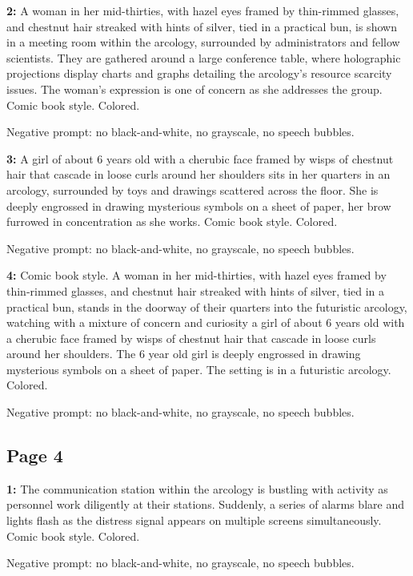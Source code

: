 \begin{iquote}
    \textbf{2:} A woman in her mid-thirties, with hazel eyes framed by thin-rimmed glasses, and chestnut hair streaked with hints of silver, tied in a practical bun, is shown in a meeting room within the arcology, surrounded by administrators and fellow scientists. They are gathered around a large conference table, where holographic projections display charts and graphs detailing the arcology's resource scarcity issues. The woman's expression is one of concern as she addresses the group. Comic book style. Colored.

    \noindent Negative prompt: no black-and-white, no grayscale, no speech bubbles.
\end{iquote}

\begin{iquote}
    \textbf{3:} A girl of about 6 years old with a cherubic face framed by wisps of chestnut hair that cascade in loose curls around her shoulders sits in her quarters in an arcology, surrounded by toys and drawings scattered across the floor. She is deeply engrossed in drawing mysterious symbols on a sheet of paper, her brow furrowed in concentration as she works. Comic book style. Colored.

    \noindent Negative prompt: no black-and-white, no grayscale, no speech bubbles.
\end{iquote}

\begin{iquote}
    \textbf{4:} Comic book style. A woman in her mid-thirties, with hazel eyes framed by thin-rimmed glasses, and chestnut hair streaked with hints of silver, tied in a practical bun, stands in the doorway of their quarters into the futuristic arcology, watching with a mixture of concern and curiosity a girl of about 6 years old with a cherubic face framed by wisps of chestnut hair that cascade in loose curls around her shoulders. The 6 year old girl is deeply engrossed in drawing mysterious symbols on a sheet of paper. The setting is in a futuristic arcology. Colored.

    \noindent Negative prompt: no black-and-white, no grayscale, no speech bubbles.
\end{iquote}


\subsection*{Page 4}
\begin{iquote}
    \textbf{1:} The communication station within the arcology is bustling with activity as personnel work diligently at their stations. Suddenly, a series of alarms blare and lights flash as the distress signal appears on multiple screens simultaneously. Comic book style. Colored.

    \noindent Negative prompt: no black-and-white, no grayscale, no speech bubbles.
\end{iquote}


